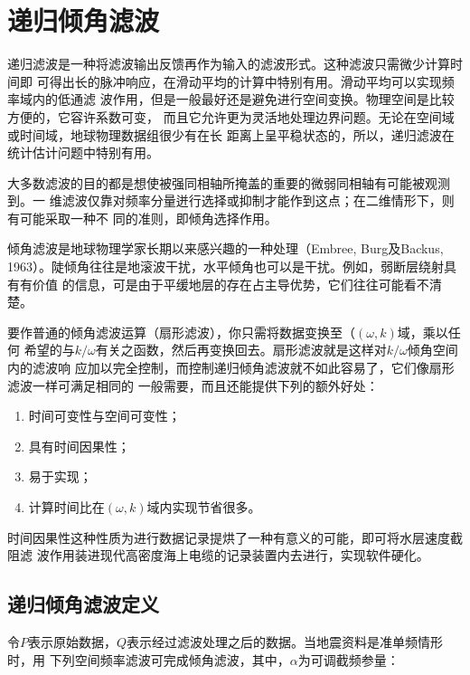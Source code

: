 \section{递归倾角滤波}
\label{sec:2.5}
递归滤波是一种将滤波输出反馈再作为输入的滤波形式。这种滤波只需微少计算时间即
可得出长的脉冲响应，在滑动平均的计算中特别有用。滑动平均可以实现频率域内的低通滤
波作用，但是一般最好还是避免进行空间变换。物理空间是比较方便的，它容许系数可变，
而且它允许更为灵活地处理边界问题。无论在空间域或时间域，地球物理数据组很少有在长
距离上呈平稳状态的，所以，递归滤波在统计估计问题中特别有用。

大多数滤波的目的都是想使被强同相轴所掩盖的重要的微弱同相轴有可能被观测到。一
维滤波仅靠对频率分量迸行选择或抑制才能作到这点；在二维情形下，则有可能采取一种不
同的准则，即倾角选择作用。

倾角滤波是地球物理学家长期以来感兴趣的一种处理（Embree, Burg及Backus,
1963）。陡倾角往往是地滚波干扰，水平倾角也可以是干扰。例如，弱断层绕射具有有价值
的信息，可是由于平缓地层的存在占主导优势，它们往往可能看不清楚。

要作普通的倾角滤波运算（扇形滤波），你只需将数据变换至（$(\omega,k)$域，乘以任何
希望的与$k/\omega$有关之函数，然后再变换回去。扇形滤波就是这样对$k/\omega$倾角空间内的滤波响
应加以完全控制，而控制递归倾角滤波就不如此容易了，它们像扇形滤波一样可满足相同的
一般需要，而且还能提供下列的额外好处：
\begin{enumerate}
\item 时间可变性与空间可变性；
\item
  具有时间因果性；
\item
  易于实现；
\item
  计算时间比在$(\omega,k)$域内实现节省很多。
\end{enumerate}
时间因果性这种性质为进行数据记录提烘了一种有意义的可能，即可将水层速度截阻滤
波作用装进现代高密度海上电缆的记录装置内去进行，实现软件硬化。

\subsection{递归倾角滤波定义}
\label{sec:2.5.1}
令$P$表示原始数据，$Q$表示经过滤波处理之后的数据。当地震资料是准单频情形时，用
下列空间频率滤波可完成倾角滤波，其中，$\alpha$为可调截频参量：
